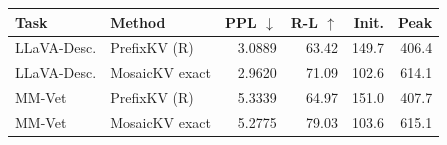 \begin{tabular}{llrrrr}
\toprule
Task & Method & PPL $\downarrow$ & R-L $\uparrow$ & Init. & Peak\\\midrule
LLaVA-Desc. & PrefixKV (R) & 3.0889 & 63.42 & 149.7 & 406.4\\
LLaVA-Desc. & MosaicKV exact & 2.9620 & 71.09 & 102.6 & 614.1\\
MM-Vet & PrefixKV (R) & 5.3339 & 64.97 & 151.0 & 407.7\\
MM-Vet & MosaicKV exact & 5.2775 & 79.03 & 103.6 & 615.1\\
\bottomrule
\end{tabular}
